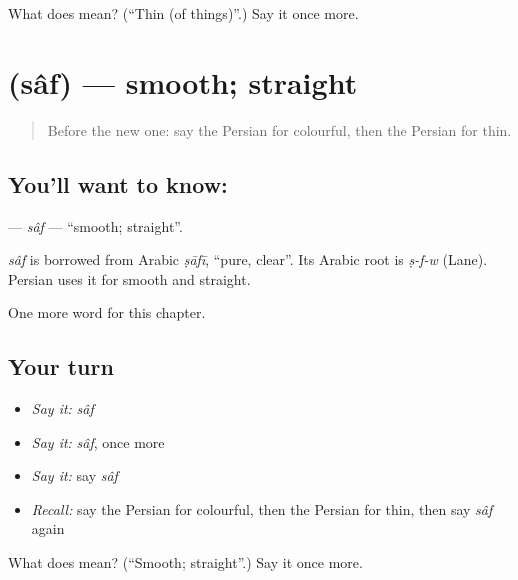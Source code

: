 \begin{tcolorbox}[breakable,colback=teal!4,colframe=teal!35!black,title={Before you move on}]
What does  mean? (\textquotedblleft{}Thin (of things)\textquotedblright{}.) Say it once more.
\end{tcolorbox}
\section[\texorpdfstring{\fa{صاف} (sâf)}{صاف (sâf)}]{ (sâf) — smooth; straight}

\label{lesson:FA-C163-saf}



\begin{quote}
Before the new one: say the Persian for colourful, then the Persian for thin.
\end{quote}

\subsection*{You'll want to know: }
\textbf{} — \emph{sâf} — \textquotedblleft{}smooth; straight\textquotedblright{}.

\begin{cousinweb}
\emph{sâf} is borrowed from Arabic \emph{ṣāfī}, \textquotedblleft{}pure, clear\textquotedblright{}. Its Arabic root is \emph{ṣ-f-w} (Lane). Persian uses it for smooth and straight.
\end{cousinweb}

\begin{grammarlens}[title={What you've built}]
One more word for this chapter.
\end{grammarlens}

\subsection*{Your turn}
\begin{itemize}
\raggedright
  \item \emph{Say it:} \emph{sâf}
  \item \emph{Say it:} \emph{sâf}, once more
  \item \emph{Say it:} say \emph{sâf}
  \item \emph{Recall:} say the Persian for colourful, then the Persian for thin, then say \emph{sâf} again
\end{itemize}

\begin{tcolorbox}[breakable,colback=teal!4,colframe=teal!35!black,title={Before you move on}]
What does  mean? (\textquotedblleft{}Smooth; straight\textquotedblright{}.) Say it once more.
\end{tcolorbox}
